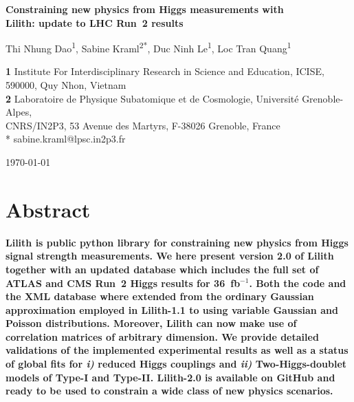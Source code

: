\documentclass[submission, Phys]{SciPost}
\begin{document}
\begin{center}{\Large \textbf{
  Constraining new physics from Higgs measurements with\\[1mm] Lilith: update to LHC Run~2 results}}\end{center}

\begin{center}
Thi Nhung Dao\textsuperscript{1},
Sabine Kraml\textsuperscript{2*},
Duc Ninh Le\textsuperscript{1},
Loc Tran Quang\textsuperscript{1}
\end{center}

\begin{center}
{\bf 1} Institute For Interdisciplinary Research in Science and Education, ICISE,\\ 590000, Quy Nhon, Vietnam\\
{\bf 2} Laboratoire de Physique Subatomique et de Cosmologie, Universit\'e Grenoble-Alpes,\\ CNRS/IN2P3, 53 Avenue des Martyrs, F-38026 Grenoble, France\\
* sabine.kraml@lpsc.in2p3.fr
\end{center}

\begin{center}
\today
\end{center}


\section*{Abstract}
{\bf
Lilith is public python library for constraining new physics from Higgs signal strength measurements. 
We here present version 2.0 of Lilith together with an updated database which includes the full set 
of ATLAS and CMS Run~2 Higgs results for 36~fb$^{-1}$.  
Both the code and the XML database where extended from the ordinary Gaussian approximation employed in 
Lilith-1.1 to using variable Gaussian and Poisson distributions.  Moreover, Lilith can now make use of correlation 
matrices  of arbitrary dimension. 
We provide detailed validations of the implemented experimental results as well as 
a status of global fits for {\it i)} reduced Higgs couplings and {\it ii)} Two-Higgs-doublet models of Type-I and Type-II. 
Lilith-2.0 is available on GitHub and ready to be used to constrain a wide class of new physics scenarios.}
\end{document}
